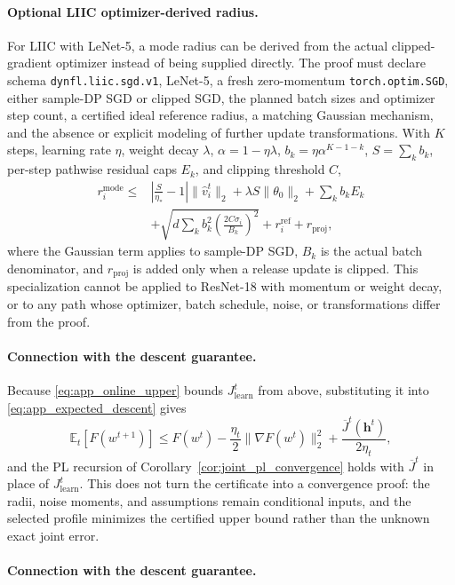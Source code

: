 \documentclass[5p,times]{elsarticle}
\theoremstyle{plain}
\theoremstyle{definition}
\theoremstyle{remark}
\begin{document}
\paragraph{Optional LIIC optimizer-derived radius.}
For LIIC with LeNet-5, a mode radius can be derived from the actual
clipped-gradient optimizer instead of being supplied directly. The
proof must declare schema \texttt{dynfl.liic.sgd.v1}, LeNet-5, a fresh
zero-momentum \texttt{torch.optim.SGD}, either sample-DP SGD or clipped
SGD, the planned batch sizes and optimizer step count, a certified
ideal reference radius, a matching Gaussian mechanism, and the absence
or explicit modeling of further update transformations. With $K$ steps,
learning rate $\eta$, weight decay $\lambda$,
$\alpha=1-\eta\lambda$, $b_k=\eta\alpha^{K-1-k}$, $S=\sum_kb_k$,
per-step pathwise residual caps $E_k$, and clipping threshold $C$,
\begin{equation}
\begin{aligned}
r_i^{\mathrm{mode}}
\le{}&
\left|\frac{S}{\eta_*}-1\right|\|\hat v_i^t\|_2
+\lambda S\|\theta_0\|_2+\sum_kb_kE_k\\
&+\sqrt{d\sum_kb_k^2
\left(\frac{2C\sigma_i}{B_k}\right)^2}
+r_i^{\mathrm{ref}}+r_{\mathrm{proj}},
\end{aligned}
\label{eq:app_liic_radius}
\end{equation}
where the Gaussian term applies to sample-DP SGD, $B_k$ is the actual
batch denominator, and $r_{\mathrm{proj}}$ is added only when a release
update is clipped. This specialization cannot be applied to ResNet-18
with momentum or weight decay, or to any path whose optimizer, batch
schedule, noise, or transformations differ from the proof.

\paragraph{Connection with the descent guarantee.}
Because \eqref{eq:app_online_upper} bounds
$J_{\mathrm{learn}}^t$ from above, substituting it into
\eqref{eq:app_expected_descent} gives
\begin{equation}
\mathbb E_t[F(w^{t+1})]
\le F(w^t)-\frac{\eta_t}{2}\|\nabla F(w^t)\|_2^2
+\frac{\overline J^t(\mathbf h^t)}{2\eta_t},
\end{equation}
and the PL recursion of Corollary~\ref{cor:joint_pl_convergence} holds
with $\overline J^t$ in place of $J_{\mathrm{learn}}^t$. This does not
turn the certificate into a convergence proof: the radii, noise
moments, and assumptions remain conditional inputs, and the selected
profile minimizes the certified upper bound rather than the unknown
exact joint error.
\paragraph{Connection with the descent guarantee.}



\end{document}
